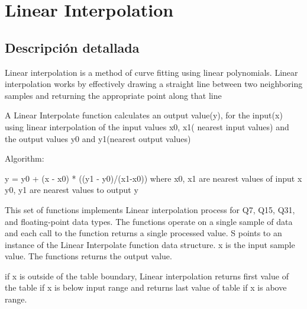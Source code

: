 \hypertarget{group___linear_interpolate}{}\section{Linear Interpolation}
\label{group___linear_interpolate}


\subsection{Descripción detallada}
Linear interpolation is a method of curve fitting using linear polynomials. Linear interpolation works by effectively drawing a straight line between two neighboring samples and returning the appropriate point along that line

\begin{DoxyParagraph}{}
 
\end{DoxyParagraph}
\begin{DoxyParagraph}{}
A Linear Interpolate function calculates an output value(y), for the input(x) using linear interpolation of the input values x0, x1( nearest input values) and the output values y0 and y1(nearest output values)
\end{DoxyParagraph}
\begin{DoxyParagraph}{Algorithm\+:}

\begin{DoxyPre}
      y = y0 + (x - x0) * ((y1 - y0)/(x1-x0))
      where x0, x1 are nearest values of input x
            y0, y1 are nearest values to output y
\end{DoxyPre}

\end{DoxyParagraph}
\begin{DoxyParagraph}{}
This set of functions implements Linear interpolation process for Q7, Q15, Q31, and floating-\/point data types. The functions operate on a single sample of data and each call to the function returns a single processed value. {\ttfamily S} points to an instance of the Linear Interpolate function data structure. {\ttfamily x} is the input sample value. The functions returns the output value.
\end{DoxyParagraph}
\begin{DoxyParagraph}{}
if x is outside of the table boundary, Linear interpolation returns first value of the table if x is below input range and returns last value of table if x is above range. 
\end{DoxyParagraph}
